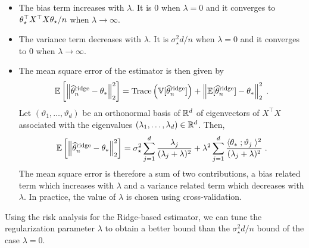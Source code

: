 \begin{remark}
\begin{itemize}
\item The bias term increases with $\lambda$. It is 0 when $\lambda = 0$ and it converges to $\theta_\star^\top X^\top X\theta_\star / n$ when $\lambda\to \infty$.
\item  The variance term decreases with $\lambda$. It is $\sigma_\star^2 d /n$ when $\lambda = 0$ and it converges to $0$ when $\lambda\to \infty$.
\item The mean square error of the estimator is then given by
\[
\mathbb{E}\left[\left\|\widehat {\theta}^{\mathrm{ridge}}_n-\theta_*\right\|_2^2\right] = \mathrm{Trace}\left(\mathbb{V}[\widehat {\theta}^{\mathrm{ridge}}_n]\right) + \left\|\mathbb{E}[\widehat {\theta}^{\mathrm{ridge}}_n] - \theta_*\right\|_2^2\;.
\]
Let $(\vartheta_1,\ldots,\vartheta_d)$ be an orthonormal basis of $\mathbb{R}^d$ of eigenvectors of $X^\top X$ associated with the eigenvalues $(\lambda_1,\ldots,\lambda_d)\in\mathbb{R}^d$. Then,
\[
\mathbb{E}\left[\left\|\widehat {\theta}^{\mathrm{ridge}}_n-\theta_*\right\|_2^2\right] =  \sigma_\star^2 \sum_{j=1}^d \frac{\lambda_j}{(\lambda_j+\lambda)^2} + \lambda^2  \sum_{j=1}^d \frac{\langle \theta_* \;; \vartheta_j\;\rangle^2}{(\lambda_j+\lambda)^2}\;.
\]
The mean square error is therefore a sum of two contributions, a bias related term which increases with $\lambda$ and a variance related term which decreases with $\lambda$. In practice, the value of $\lambda$ is chosen using cross-validation.
\end{itemize}
\end{remark}
Using the risk analysis for the Ridge-based estimator, we can tune the regularization parameter $\lambda$ to obtain
a  better bound than the $\sigma_\star^2 d /n$ bound of the case $\lambda = 0$.
